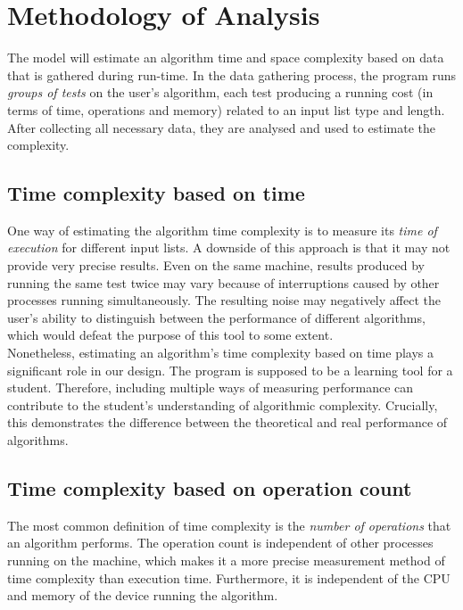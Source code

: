 \documentclass{article}
\begin{document}
    \section{Methodology of Analysis}
            
            The model will estimate an algorithm time and space complexity based on data that is gathered during run-time. In the data gathering process, the program runs \textit{groups of tests} on the user's algorithm, each test producing a running cost (in terms of time, operations and memory) related to an input list type and length. After collecting all necessary data, they are analysed and used to estimate the complexity.
            
            \subsection{Time complexity based on time} \label{timeBasedComplx}
                One way of estimating the algorithm time complexity is to measure its \textit{time of execution} for different input lists. A downside of this approach is that it may not provide very precise results. Even on the same machine, results produced by running the same test twice may vary because of interruptions caused by other processes running simultaneously. The resulting noise may negatively affect the user's ability to distinguish between the performance of different algorithms, which would defeat the purpose of this tool to some extent.\\
                
                Nonetheless, estimating an algorithm's time complexity based on time plays a significant role in our design. The program is supposed to be a learning tool for a student. Therefore, including multiple ways of measuring performance can contribute to the student's understanding of algorithmic complexity. Crucially, this demonstrates the difference between the theoretical and real performance of algorithms.
            
            
            \subsection{Time complexity based on operation count} \label{nooBasedComplx}
                The most common definition of time complexity is the \textit{number of operations} that an algorithm performs. The operation count is independent of other processes running on the machine, which makes it a more precise measurement method of time complexity than execution time. Furthermore, it is independent of the CPU and memory of the device running the algorithm. \\
                
\end{document}
